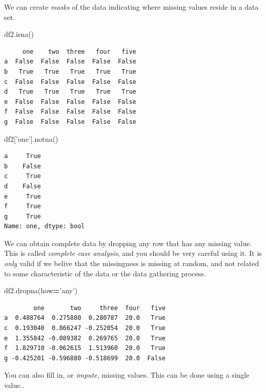 \documentclass[
  letterpaper,
]{scrbook}
\newenvironment{Shaded}{\begin{snugshade}}{\end{snugshade}}
\newcommand{\NormalTok}[1]{#1}
\newcommand{\OperatorTok}[1]{\textcolor[rgb]{0.81,0.36,0.00}{\textbf{#1}}}
\newcommand{\StringTok}[1]{\textcolor[rgb]{0.31,0.60,0.02}{#1}}
\begin{document}
We can create \emph{masks} of the data indicating where missing values reside in a data set.

\begin{Shaded}
\begin{Highlighting}[]
\NormalTok{df2.isna()}
\end{Highlighting}
\end{Shaded}

\begin{verbatim}
     one    two  three   four   five
a  False  False  False  False  False
b   True   True   True   True   True
c  False  False  False  False  False
d   True   True   True   True   True
e  False  False  False  False  False
f  False  False  False  False  False
g  False  False  False  False  False
\end{verbatim}

\begin{Shaded}
\begin{Highlighting}[]
\NormalTok{df2[}\StringTok{'one'}\NormalTok{].notna()}
\end{Highlighting}
\end{Shaded}

\begin{verbatim}
a     True
b    False
c     True
d    False
e     True
f     True
g     True
Name: one, dtype: bool
\end{verbatim}

We can obtain complete data by dropping any row that has any missing value. This is called \emph{complete case analysis}, and you should be very careful using it. It is \emph{only} valid if we belive that the missingness is missing at random, and not related to some characteristic of the data or the data gathering process.

\begin{Shaded}
\begin{Highlighting}[]
\NormalTok{df2.dropna(how}\OperatorTok{=}\StringTok{'any'}\NormalTok{)}
\end{Highlighting}
\end{Shaded}

\begin{verbatim}
        one       two     three  four   five
a  0.488764  0.275880  0.280787  20.0   True
c  0.193040  0.866247 -0.252054  20.0   True
e  1.355842 -0.089382  0.269765  20.0   True
f  1.829710 -0.062615  1.513960  20.0   True
g -0.425201 -0.596880 -0.518699  20.0  False
\end{verbatim}

You can also fill in, or \emph{impute}, missing values. This can be done using a single value..
\end{document}
